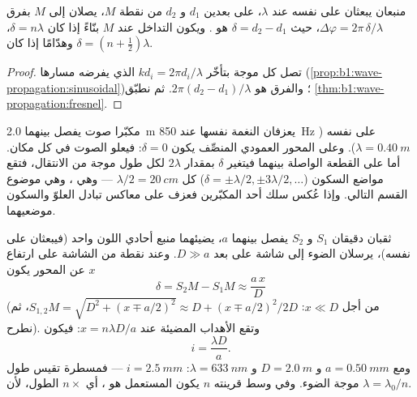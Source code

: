\begin{proposition}\label{prop:b1:wave-propagation:pathdiff}
منبعان يبعثان على  نفسه عند  $\lambda$، على بعدين
$d_1$ و $d_2$ من نقطة $M$، يصلان إلى $M$ بفرق 
$\Delta\varphi = 2\pi\,\delta/\lambda$، حيث $\delta = d_2 - d_1$ هو
\emph{}. ويكون التداخل عند $M$ بنّاءً إذا كان
$\delta = n\lambda$، وهدّامًا إذا كان $\delta = (n + \tfrac12)\lambda$.
\end{proposition}

\begin{proof}
تصل كل موجة بتأخّر  $kd_i = 2\pi d_i/\lambda$ الذي يفرضه
مسارها (\cref{prop:b1:wave-propagation:sinusoidal})؛ والفرق هو
$2\pi(d_2 - d_1)/\lambda$. ثم نطبّق \cref{thm:b1:wave-propagation:fresnel}.
\end{proof}

\begin{example}\label{ex:b1:wave-propagation:speakers}
مكبّرا صوت يفصل بينهما \qty{2.0}{m} يعزفان النغمة نفسها عند \qty{850}{Hz} على
 نفسه ($\lambda = \qty{0.40}{m}$). وعلى المحور العمودي المنصِّف يكون
$\delta = 0$: فيعلو الصوت في كل مكان. أما على القطعة الواصلة بينهما فيتغير $\delta$
بمقدار $2\lambda$ لكل طول موجة من الانتقال، فتقع مواضع السكون
($\delta = \pm\lambda/2, \pm 3\lambda/2, \dots$) كل
$\lambda/2 = \qty{20}{cm}$ --- وهي ، وهي موضوع القسم
التالي. وإذا عُكس سلك أحد المكبّرين فعزف على  معاكس تبادل العلوّ
والسكون موضعيهما.
\end{example}

\begin{example}\label{ex:b1:wave-propagation:young}
ثقبان دقيقان $S_1$ و $S_2$ يفصل بينهما $a$، يضيئهما منبع
أحادي اللون واحد (فيبعثان على  نفسه)، يرسلان الضوء إلى
شاشة على بعد $D \gg a$. وعند نقطة من الشاشة على ارتفاع $x$
عن المحور يكون 
\[
\delta = S_2M - S_1M \approx \frac{a\,x}{D}
\]
(من أجل $x \ll D$: $S_{1,2}M = \sqrt{D^2 + (x \mp a/2)^2} \approx D +
(x \mp a/2)^2/2D$، ثم نطرح). وتقع الأهداب المضيئة عند $x = n\lambda D/a$:
فيكون \emph{}
\[
i = \frac{\lambda D}{a} .
\]
ومع $a = \qty{0.50}{mm}$ و $D = \qty{2.0}{m}$ و $\lambda = \qty{633}{nm}$:
$i = \qty{2.5}{mm}$ --- فمسطرة تقيس طول موجة الضوء. وفي
وسط قرينته $n$ يكون  المستعمل هو \emph{}، أي $n \times$ الطول، لأن $\lambda = \lambda_0/n$.
\end{example}

